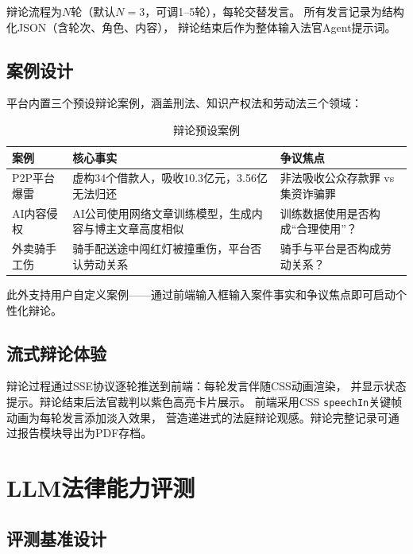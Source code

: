 \documentclass[12pt,a4paper,twoside]{ctexart}
\begin{document}
辩论流程为$N$轮（默认$N=3$，可调1--5轮），每轮交替发言。
所有发言记录为结构化JSON（含轮次、角色、内容），
辩论结束后作为整体输入法官Agent提示词。

\subsection{案例设计}

平台内置三个预设辩论案例，涵盖刑法、知识产权法和劳动法三个领域：

\begin{table}[H]
\centering
\caption{辩论预设案例}
\label{tab:debate_cases}
\begin{tabular}{@{}p{2.5cm}p{3.8cm}p{5.5cm}@{}}
\toprule
\textbf{案例} & \textbf{核心事实} & \textbf{争议焦点} \\
\midrule
P2P平台爆雷   & 虚构34个借款人，吸收10.3亿元，3.56亿无法归还
                & 非法吸收公众存款罪 vs 集资诈骗罪 \\
\midrule
AI内容侵权    & AI公司使用网络文章训练模型，生成内容与博主文章高度相似
                & 训练数据使用是否构成``合理使用''？ \\
\midrule
外卖骑手工伤 & 骑手配送途中闯红灯被撞重伤，平台否认劳动关系
                & 骑手与平台是否构成劳动关系？ \\
\bottomrule
\end{tabular}
\end{table}

此外支持用户自定义案例——通过前端输入框输入案件事实和争议焦点即可启动个性化辩论。

\subsection{流式辩论体验}

辩论过程通过SSE协议逐轮推送到前端：每轮发言伴随CSS动画渲染，
并显示状态提示。辩论结束后法官裁判以紫色高亮卡片展示。
前端采用CSS \texttt{speechIn}关键帧动画为每轮发言添加淡入效果，
营造递进式的法庭辩论观感。辩论完整记录可通过报告模块导出为PDF存档。

\section{LLM法律能力评测}

\subsection{评测基准设计}
\end{document}
